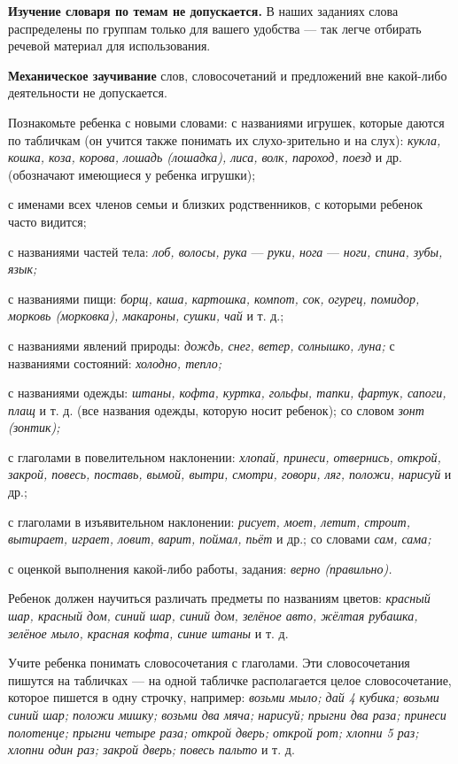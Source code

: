 \documentclass[a5paper]{book}
\renewcommand{\emph}[1]{\textit{#1}}
\begin{document}
\textbf{Изучение словаря по темам не допускается.} В наших заданиях
слова распределены по группам только для вашего удобства --- так легче
отбирать речевой материал для использования.

\textbf{Механическое заучивание} слов, словосочетаний и предложений вне
какой-либо деятельности не допускается.

Познакомьте ребенка с новыми словами: с названиями игрушек, которые
даются по табличкам (он учится также понимать их слухо-зрительно и на
слух): \emph{кукла, кошка, коза, корова, лошадь (лошадка), лиса, волк,
пароход, поезд} и др. (обозначают имеющиеся у ребенка игрушки);

с именами всех членов семьи и близких родственников, с которыми ребенок
часто видится;

с названиями частей тела: \emph{лоб, волосы, рука} --- \emph{руки, нога}
--- \emph{ноги, спина, зубы, язык;}

с названиями пищи: \emph{борщ, каша, картошка, компот, сок, огурец,
помидор, морковь (морковка), макароны, сушки, чай} и т. д.;

с названиями явлений природы: \emph{дождь, снег, ветер, солнышко, луна;}
с названиями состояний: \emph{холодно, тепло;}

с названиями одежды: \emph{штаны, кофта, куртка, гольфы, тапки, фартук,
сапоги, плащ} и т. д. (все названия одежды, которую носит ребенок); со
словом \emph{зонт (зонтик);}

с глаголами в повелительном наклонении: \emph{хлопай, принеси,
отвернись, открой, закрой, повесь, поставь, вымой, вытри, смотри,
говори, ляг, положи, нарисуй} и др.;

с глаголами в изъявительном наклонении: \emph{рисует, моет, летит,
строит, вытирает, играет, ловит, варит, поймал, пьёт} и др.; со словами
\emph{сам, сама;}

с оценкой выполнения какой-либо работы, задания: \emph{верно
(правильно).}

Ребенок должен научиться различать предметы по названиям цветов:
\emph{красный шар, красный дом, синий шар, синий дом, зелёное авто,
жёлтая рубашка, зелёное мыло, красная кофта, синие штаны} и т. д.

Учите ребенка понимать словосочетания с глаголами. Эти словосочетания
пишутся на табличках --- на одной табличке располагается целое
словосочетание, которое пишется в одну строчку, например: \emph{возьми
мыло; дай 4 кубика; возьми синий шар; положи мишку; возьми два мяча;
нарисуй; прыгни два раза; принеси полотенце; прыгни четыре раза; открой
дверь; открой рот; хлопни 5 раз; хлопни один раз; закрой дверь; повесь
пальто} и т. д.
\end{document}
